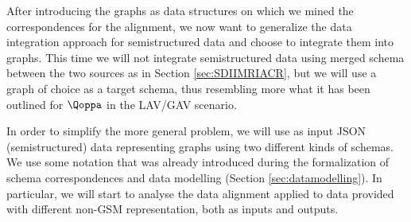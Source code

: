 


\label{sss:gdi}
After introducing the graphs as data structures on which we mined the correspondences for the alignment, we now want to generalize the data integration approach for semistructured data and choose to integrate them into  graphs. This time we will not integrate semistructured data using merged schema between the two sources as in Section \vref{sec:SDIIMRIACR}, but we will use a graph of choice as a target schema, thus resembling more what it has been outlined for $\qtransl$ in the LAV/GAV scenario. 

In order to simplify the more general problem, we will use as input  JSON (semistructured) data representing graphs using two different kinds of schemas. We use some notation that was already introduced during the formalization of schema correspondences and data modelling (Section \vref{sec:datamodelling}). In particular, we will start to analyse the data alignment applied to data provided with different non-GSM representation, both as inputs and outputs.


